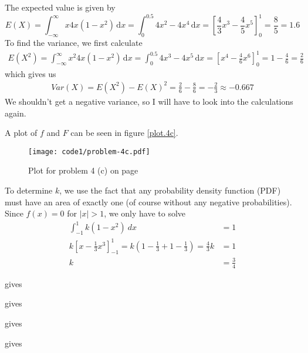 \documentclass[a4paper,english,12pt]{article}
\begin{document}
The expected value is given by
\[
  E(X)
    = \int_{-\infty}^{\infty} x 4x(1-x^2)\, \mathrm{d} x
    = \int_{0}^{0.5} 4x^2 - 4x^4 \, \mathrm{d} x
    = \left[ \frac{4}{3}x^3 - \frac{4}{5}x^5 \right]_{0}^{1}
    = \frac{8}{5} = 1.6
\]
To find the variance, we first calculate
\begin{align*}
  E(X^2)
    = \int_{-\infty}^{\infty} x^2 4x(1-x^2)\, \mathrm{d} x
    = \int_{0}^{0.5} 4x^3 - 4x^5 \, \mathrm{d} x
    = \left[ x^4 - \frac{4}{6}x^6 \right]_{0}^{1}
    = 1 - \frac{4}{6} = \frac{2}{6}
\end{align*}
which gives us
\begin{align*}
  Var(X) = E(X^2) - E(X)^2 = \frac{2}{6} - \frac{8}{6} = -\frac{2}{3} \approx -0.667
\end{align*}
We shouldn't get a negative variance, so I will have to look into the
calculations again.


A plot of $f$ and $F$ can be seen in figure \vref{plot.4c}.
\begin{figure}[h]
  \texttt{[image: code1/problem-4c.pdf]}
  \caption{Plot for problem 4 (c) on page \pageref{problem.4 (c)}}
  \label{plot.4c}
\end{figure}

To determine $k$, we use the fact that any probability density function (PDF)
must have an area of exactly one (of course without any negative
probabilities). Since $f(x) = 0$ for $|x| > 1$, we only have to solve
\begin{align*}
  \int_{-1}^{1}{k(1-x^2)~dx} &= 1 \\
  k\left[ x - \frac{1}{3}{x^3} \right]_{-1}^{1} =
  k\left( 1 - \frac{1}{3} + 1 - \frac{1}{3} \right) = \frac{4}{3}k &= 1 \\
   k &= \frac{3}{4}
\end{align*}






\texttt{} gives
\texttt{}

\texttt{} gives
\texttt{}

 gives
\texttt{}

\texttt{} gives
\texttt{}

\end{document}

